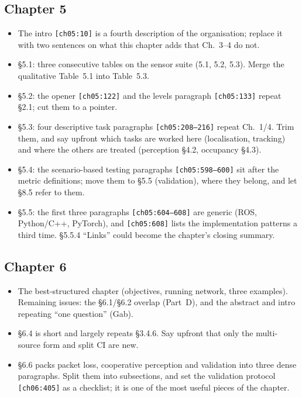 \documentclass[10pt,a4paper]{article}
\newcommand{\src}[1]{{\footnotesize\texttt{[#1]}}}
\begin{document}
\subsection*{Chapter 5}
\begin{itemize}
\item The intro \src{ch05:10} is a fourth description of the organisation; replace it with two sentences on what this chapter adds that Ch.~3--4 do not.
\item \S5.1: three consecutive tables on the sensor suite (5.1, 5.2, 5.3). Merge the qualitative Table~5.1 into Table~5.3.
\item \S5.2: the opener \src{ch05:122} and the levels paragraph \src{ch05:133} repeat \S2.1; cut them to a pointer.
\item \S5.3: four descriptive task paragraphs \src{ch05:208--216} repeat Ch.~1/4. Trim them, and say upfront which tasks are worked here (localisation, tracking) and where the others are treated (perception \S4.2, occupancy \S4.3).
\item \S5.4: the scenario-based testing paragraphs \src{ch05:598--600} sit after the metric definitions; move them to \S5.5 (validation), where they belong, and let \S8.5 refer to them.
\item \S5.5: the first three paragraphs \src{ch05:604--608} are generic (ROS, Python/C++, PyTorch), and \src{ch05:608} lists the implementation patterns a third time. \S5.5.4 ``Links'' could become the chapter's closing summary.
\end{itemize}

\subsection*{Chapter 6}
\begin{itemize}
\item The best-structured chapter (objectives, running network, three examples). Remaining issues: the \S6.1/\S6.2 overlap (Part~D), and the abstract and intro repeating ``one question'' (Gab).
\item \S6.4 is short and largely repeats \S3.4.6. Say upfront that only the multi-source form and split CI are new.
\item \S6.6 packs packet loss, cooperative perception and validation into three dense paragraphs. Split them into subsections, and set the validation protocol \src{ch06:405} as a checklist; it is one of the most useful pieces of the chapter.
\end{itemize}
\end{document}

